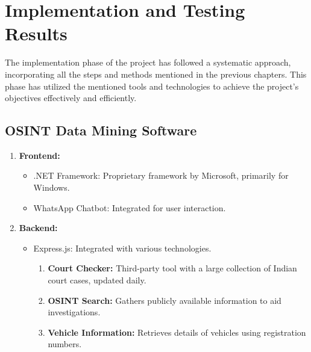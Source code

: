 \chapter{Implementation and Testing Results}\label{ch:implementation-and-testing-results}
\justify

The implementation phase of the project has followed a systematic approach, incorporating all the steps and methods mentioned in the previous chapters.
This phase has utilized the mentioned tools and technologies to achieve the project's objectives effectively and efficiently.

\section{OSINT Data Mining Software}\label{sec:osint-data-mining-software}
\begin{enumerate}[label=\roman*.]
    \item \textbf{Frontend:}
    \begin{itemize}
        \item .NET Framework: Proprietary framework by Microsoft, primarily for Windows.
        \item WhatsApp Chatbot: Integrated for user interaction.
    \end{itemize}

    \item \textbf{Backend:}
    \begin{itemize}
        \item Express.js: Integrated with various technologies.
        \begin{enumerate}[label=\arabic*.]
            \item \textbf{Court Checker:} Third-party tool with a large collection of Indian court cases, updated daily.
            \item \textbf{OSINT Search:} Gathers publicly available information to aid investigations.
            \item \textbf{Vehicle Information:} Retrieves details of vehicles using registration numbers.
        \end{enumerate}
    \end{itemize}


\end{enumerate}

